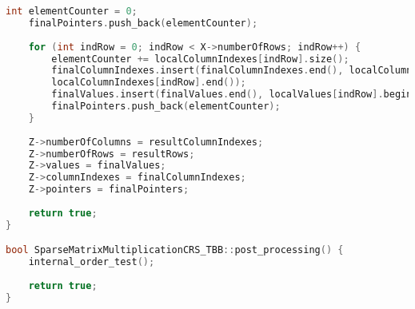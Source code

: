 \documentclass[a4paper, 14pt]{article}
\theoremstyle{plain}
\begin{document}
\begin{lstlisting}[language=C++,caption=Файл sparse\_matmult\_crs\_tbb.cpp]
	int elementCounter = 0;
	finalPointers.push_back(elementCounter);
	
	for (int indRow = 0; indRow < X->numberOfRows; indRow++) {
		elementCounter += localColumnIndexes[indRow].size();
		finalColumnIndexes.insert(finalColumnIndexes.end(), localColumnIndexes[indRow].begin(),
		localColumnIndexes[indRow].end());
		finalValues.insert(finalValues.end(), localValues[indRow].begin(), localValues[indRow].end());
		finalPointers.push_back(elementCounter);
	}
	
	Z->numberOfColumns = resultColumnIndexes;
	Z->numberOfRows = resultRows;
	Z->values = finalValues;
	Z->columnIndexes = finalColumnIndexes;
	Z->pointers = finalPointers;
	
	return true;
}

bool SparseMatrixMultiplicationCRS_TBB::post_processing() {
	internal_order_test();
	
	return true;
}
\end{lstlisting}
\end{document}
